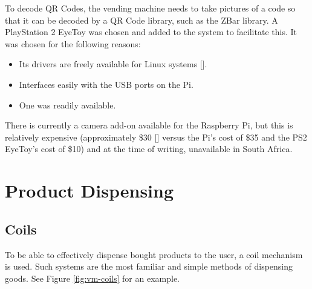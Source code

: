 To decode QR Codes, the vending machine needs to take pictures of a code so that it can be
decoded by a QR Code library, such as the ZBar library. A PlayStation 2 EyeToy was
chosen and added to the system to facilitate this. It was chosen for the following reasons:

\begin{itemize}
  \item Its drivers are freely available for Linux systems [\cite{website:webcam-drivers}].
  \item Interfaces easily with the USB ports on the Pi.
  \item One was readily available.
\end{itemize}

There is currently a camera add-on available for the Raspberry Pi, but this is relatively
expensive (approximately \$30 [\cite{website:raspi-camera}] versus the Pi's cost of \$35 
and the PS2 EyeToy's cost of \$10) and at the time of writing, unavailable in
South Africa.

\section{Product Dispensing}

\subsection{Coils}

To be able to effectively dispense bought products to the user, a coil mechanism is
used. Such systems are the most familiar and simple methods of dispensing goods. See Figure
\ref{fig:vm-coils} for an example.

